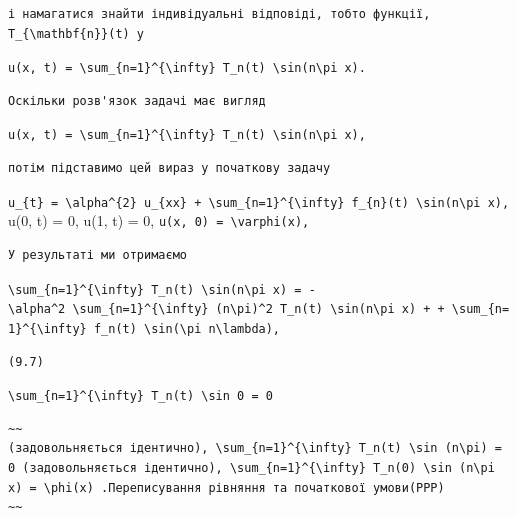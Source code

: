 \documentclass[
  ukrainian,
]{article}
\begin{document}
\begin{verbatim}
і намагатися знайти індивідуальні відповіді, тобто функції, T_{\mathbf{n}}(t) у
\end{verbatim}

\texttt{u(x,\ t)\ =\ \textbackslash{}sum\_\{n=1\}\^{}\{\textbackslash{}infty\}\ T\_n(t)\ \textbackslash{}sin(n\textbackslash{}pi\ x).}

\begin{verbatim}
Оскільки розв'язок задачі має вигляд
\end{verbatim}

\texttt{u(x,\ t)\ =\ \textbackslash{}sum\_\{n=1\}\^{}\{\textbackslash{}infty\}\ T\_n(t)\ \textbackslash{}sin(n\textbackslash{}pi\ x),}

\begin{verbatim}
потім підставимо цей вираз у початкову задачу
\end{verbatim}

\texttt{u\_\{t\}\ =\ \textbackslash{}alpha\^{}\{2\}\ u\_\{xx\}\ +\ \textbackslash{}sum\_\{n=1\}\^{}\{\textbackslash{}infty\}\ f\_\{n\}(t)\ \textbackslash{}sin(n\textbackslash{}pi\ x),}
u(0, t) = 0, u(1, t) = 0,
\texttt{u(x,\ 0)\ =\ \textbackslash{}varphi(x),}

\begin{verbatim}
У результаті ми отримаємо
\end{verbatim}

\texttt{\textbackslash{}sum\_\{n=1\}\^{}\{\textbackslash{}infty\}\ T\textquotesingle{}\_n(t)\ \textbackslash{}sin(n\textbackslash{}pi\ x)\ =\ -\textbackslash{}alpha\^{}2\ \textbackslash{}sum\_\{n=1\}\^{}\{\textbackslash{}infty\}\ (n\textbackslash{}pi)\^{}2\ T\_n(t)\ \textbackslash{}sin(n\textbackslash{}pi\ x)\ +\ +\ \textbackslash{}sum\_\{n=1\}\^{}\{\textbackslash{}infty\}\ f\_n(t)\ \textbackslash{}sin(\textbackslash{}pi\ n\textbackslash{}lambda),}

\begin{verbatim}
(9.7)
\end{verbatim}

\texttt{\textbackslash{}sum\_\{n=1\}\^{}\{\textbackslash{}infty\}\ T\_n(t)\ \textbackslash{}sin\ 0\ =\ 0}

\begin{verbatim}
~~
(задовольняється ідентично), \sum_{n=1}^{\infty} T_n(t) \sin (n\pi) = 0 (задовольняється ідентично), \sum_{n=1}^{\infty} T_n(0) \sin (n\pi x) = \phi(x) .Переписування рівняння та початкової умови(PPP)
~~
\end{verbatim}
\end{document}
